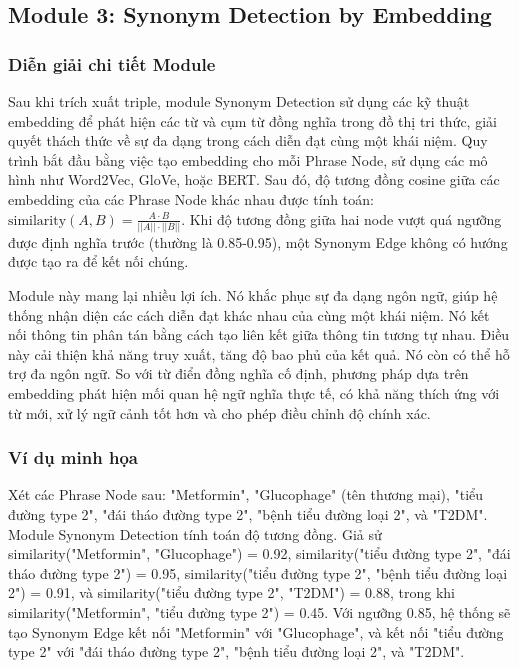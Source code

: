 \subsection{Module 3: Synonym Detection by Embedding}

\subsubsection{Diễn giải chi tiết Module}
Sau khi trích xuất triple, module Synonym Detection sử dụng các kỹ thuật embedding để phát hiện các từ và cụm từ đồng nghĩa trong đồ thị tri thức, giải quyết thách thức về sự đa dạng trong cách diễn đạt cùng một khái niệm. Quy trình bắt đầu bằng việc tạo embedding cho mỗi Phrase Node, sử dụng các mô hình như Word2Vec, GloVe, hoặc BERT. Sau đó, độ tương đồng cosine giữa các embedding của các Phrase Node khác nhau được tính toán: $\text{similarity}(A, B) = \frac{A \cdot B}{||A|| \cdot ||B||}$. Khi độ tương đồng giữa hai node vượt quá ngưỡng được định nghĩa trước (thường là 0.85-0.95), một Synonym Edge không có hướng được tạo ra để kết nối chúng.

Module này mang lại nhiều lợi ích. Nó khắc phục sự đa dạng ngôn ngữ, giúp hệ thống nhận diện các cách diễn đạt khác nhau của cùng một khái niệm. Nó kết nối thông tin phân tán bằng cách tạo liên kết giữa thông tin tương tự nhau. Điều này cải thiện khả năng truy xuất, tăng độ bao phủ của kết quả. Nó còn có thể hỗ trợ đa ngôn ngữ. So với từ điển đồng nghĩa cố định, phương pháp dựa trên embedding phát hiện mối quan hệ ngữ nghĩa thực tế, có khả năng thích ứng với từ mới, xử lý ngữ cảnh tốt hơn và cho phép điều chỉnh độ chính xác.

\subsubsection{Ví dụ minh họa}
Xét các Phrase Node sau: "Metformin", "Glucophage" (tên thương mại), "tiểu đường type 2", "đái tháo đường type 2", "bệnh tiểu đường loại 2", và "T2DM". Module Synonym Detection tính toán độ tương đồng. Giả sử similarity("Metformin", "Glucophage") = 0.92, similarity("tiểu đường type 2", "đái tháo đường type 2") = 0.95, similarity("tiểu đường type 2", "bệnh tiểu đường loại 2") = 0.91, và similarity("tiểu đường type 2", "T2DM") = 0.88, trong khi similarity("Metformin", "tiểu đường type 2") = 0.45. Với ngưỡng 0.85, hệ thống sẽ tạo Synonym Edge kết nối "Metformin" với "Glucophage", và kết nối "tiểu đường type 2" với "đái tháo đường type 2", "bệnh tiểu đường loại 2", và "T2DM".

